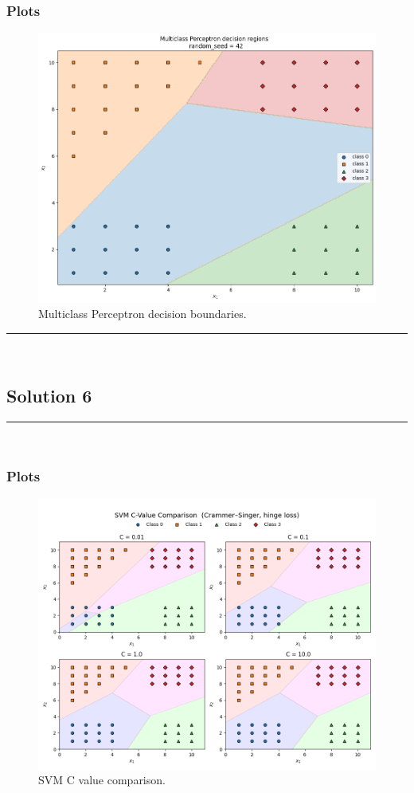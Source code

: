 \documentclass{article}
\begin{document}
\subsubsection*{Plots}
\begin{figure}[H]
\includegraphics[width=1\textwidth]{hw7_5_b.png} 
\caption{Multiclass Perceptron decision boundaries.}
\end{figure}
\noindent\rule{\textwidth}{0.4pt}\\

\newpage

\subsection*{Solution 6}
\noindent\rule{\textwidth}{0.4pt}\\

\subsubsection*{Plots}
\begin{figure}[H]
\includegraphics[width=1\textwidth]{hw7_6_a.png} 
\caption{SVM C value comparison.}
\end{figure}
\end{document}
